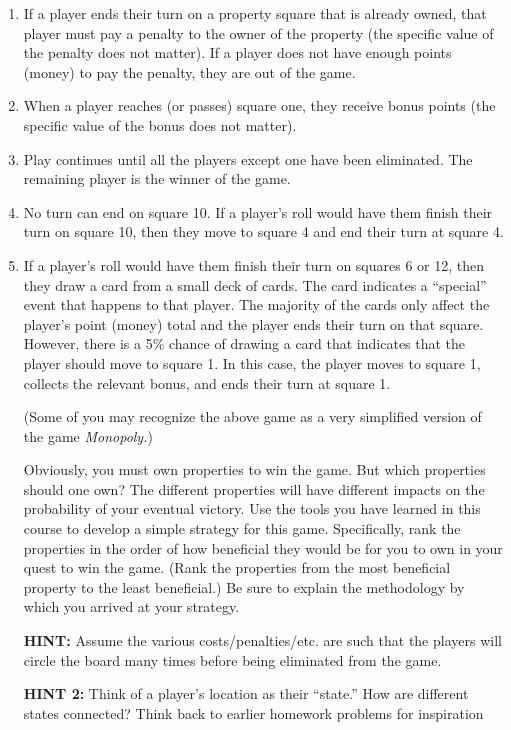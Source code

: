 \documentclass[fleqn]{article}
\begin{document}
\begin{enumerate}[nolistsep]
\begin{enumerate}
			\item If a player ends their turn on a property square that is already owned, that player must pay a penalty to the owner of the property (the specific value of the penalty does not matter). If a player does not have enough points (money) to pay the penalty, they are out of the game.
			
			\item When a player reaches (or passes) square one, they receive bonus points (the specific value of the bonus does not matter).

			\item Play continues until all the players except one have been eliminated. The remaining player is the winner of the game.

			\item No turn can end on square 10. If a player’s roll would have them finish their turn on square 10, then they move to square 4 and end their turn at square 4.

			\item If a player’s roll would have them finish their turn on squares 6 or 12, then they draw a card from a small deck of cards. The card indicates a “special” event that happens to that player. The majority of the cards only affect the player’s point (money) total and the player ends their turn on that square. However, there is a 5\% chance of drawing a card that indicates that the player should move to square 1. In this case, the player moves to square 1, collects the relevant bonus, and ends their turn at square 1.

			(Some of you may recognize the above game as a very simplified version of the game \textit{Monopoly.})

			Obviously, you must own properties to win the game. But which properties should one own? The different properties will have different impacts on the probability of your eventual victory. Use the tools you have learned in this course to develop a simple strategy for this game. Specifically, rank the properties in the order of how beneficial they would be for you to own in your quest to win the game. (Rank the properties from the most beneficial property to the least beneficial.) Be sure to explain the methodology by which you arrived at your strategy.
			
			\textbf{HINT:} Assume the various costs/penalties/etc. are such that the players will circle the board many times before being eliminated from the game.
			
			\textbf{HINT 2:} Think of a player’s location as their “state.” How are different states connected? Think back to earlier homework problems for inspiration
		\end{enumerate}
	\end{enumerate}
\end{document}
